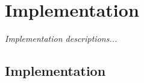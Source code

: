 \chapter{Implementation}\label{ch:implementation}
\begin{center}
{\small\em Implementation descriptions...}
\end{center}

\section{Implementation}

\newpage
